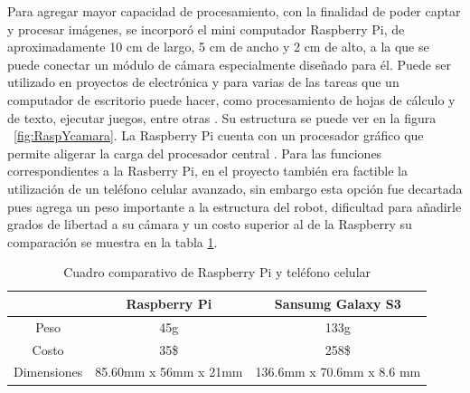 Para agregar mayor capacidad de procesamiento, con la finalidad de poder captar y procesar imágenes, se incorpor\'o el mini computador Raspberry Pi, de aproximadamente 10 cm de largo, 5 cm de ancho y 2 cm de alto, a la que se puede conectar un módulo de cámara especialmente diseñado para él. Puede ser utilizado en proyectos de electrónica y para varias de las tareas que un computador de escritorio puede hacer, como procesamiento de hojas de cálculo y de texto, ejecutar juegos, entre otras \cite{raspberry}. Su estructura se puede ver en la figura ~\ref{fig:RaspYcamara}. La Raspberry Pi cuenta con un procesador gráfico que permite aligerar la carga del procesador central \cite{elLinux}. Para las funciones correspondientes a la Rasberry Pi, en el proyecto tambi\'en era factible la utilizaci\'on de un tel\'efono celular avanzado, sin embargo esta opci\'on fue decartada pues agrega un peso importante a la estructura del robot, dificultad para añadirle grados de libertad a su cámara y un costo superior al de la Raspberry su comparaci\'on se muestra en la tabla \ref{table:celularRaspi}.  

\begin{table}
\centering
\begin{tabular}{|c| c c|}
\hline 
 & Raspberry Pi & Sansumg Galaxy S3 \\ 
 \hline
Peso & 45g & 133g \\  
Costo & 35\$ & 258\$ \\ 
 
Dimensiones & 85.60mm x 56mm x 21mm & 136.6mm x 70.6mm x 8.6 mm
 \\ 
\hline 
\end{tabular} 
\caption{Cuadro comparativo de Raspberry Pi y tel\'efono celular}
\label{table:celularRaspi}
\end{table}

